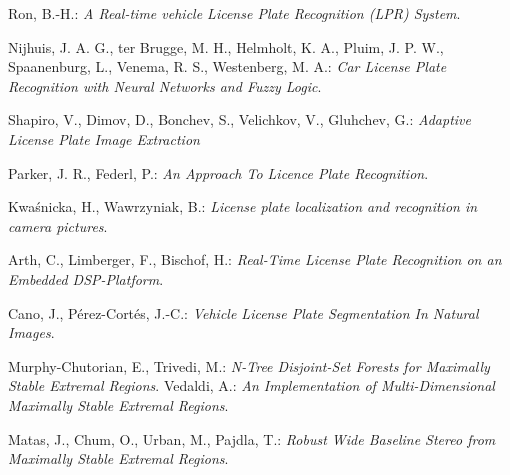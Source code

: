 \documentclass[11pt,a4paper,draft]{article}
\begin{document}
\begin{thebibliography}{99}
%



 Ron, B.-H.: \textit{A Real-time vehicle License Plate Recognition (LPR) System}.

 Nijhuis, J. A. G., ter Brugge, M. H., Helmholt, K. A., Pluim, J. P. W., Spaanenburg, L., Venema, R. S., Westenberg, M. A.: \textit{Car License Plate Recognition with Neural Networks and Fuzzy Logic}.

 Shapiro, V., Dimov, D., Bonchev, S., Velichkov, V., Gluhchev, G.: \textit{Adaptive License Plate Image Extraction}

 Parker, J. R., Federl, P.: \textit{An Approach To Licence Plate Recognition}.

 Kwa\'snicka, H., Wawrzyniak, B.: \textit{License plate localization and recognition in camera pictures}.

 Arth, C., Limberger, F., Bischof, H.: \textit{Real-Time License Plate Recognition on an Embedded DSP-Platform}.

 Cano, J., Pérez-Cortés, J.-C.: \textit{Vehicle License Plate Segmentation In Natural Images}.







 Murphy-Chutorian, E., Trivedi, M.: \textit{N-Tree Disjoint-Set Forests for Maximally Stable Extremal Regions}.
 Vedaldi, A.: \textit{An Implementation of Multi-Dimensional Maximally Stable Extremal Regions}.

 Matas, J., Chum, O., Urban, M., Pajdla, T.: \textit{Robust Wide Baseline Stereo from Maximally Stable Extremal Regions}.


\end{thebibliography}
\end{document}
